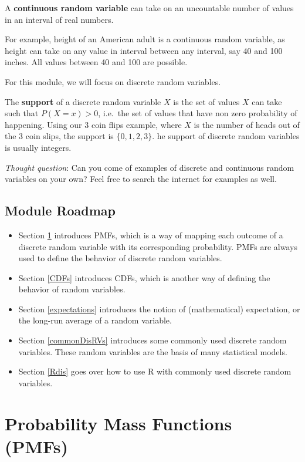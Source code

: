 \documentclass[
]{book}
\providecommand{\tightlist}{%
  \setlength{\itemsep}{0pt}\setlength{\parskip}{0pt}}
\begin{document}
A \textbf{continuous random variable} can take on an uncountable number of values in an interval of real numbers.

For example, height of an American adult is a continuous random variable, as height can take on any value in interval between any interval, say 40 and 100 inches. All values between 40 and 100 are possible.

For this module, we will focus on discrete random variables.

The \textbf{support} of a discrete random variable \(X\) is the set of values \(X\) can take such that \(P(X = x) > 0\), i.e.~the set of values that have non zero probability of happening. Using our 3 coin flips example, where \(X\) is the number of heads out of the 3 coin slips, the support is \(\{0,1,2,3 \}\). he support of discrete random variables is usually integers.

\emph{Thought question}: Can you come of examples of discrete and continuous random variables on your own? Feel free to search the internet for examples as well.

\hypertarget{module-roadmap-1}{%
\subsection{Module Roadmap}\label{module-roadmap-1}}

\begin{itemize}
\tightlist
\item
  Section \ref{PMFs} introduces PMFs, which is a way of mapping each outcome of a discrete random variable with its corresponding probability. PMFs are always used to define the behavior of discrete random variables.
\item
  Section \ref{CDFs} introduces CDFs, which is another way of defining the behavior of random variables.
\item
  Section \ref{expectations} introduces the notion of (mathematical) expectation, or the long-run average of a random variable.
\item
  Section \ref{commonDisRVs} introduces some commonly used discrete random variables. These random variables are the basis of many statistical models.
\item
  Section \ref{Rdis} goes over how to use R with commonly used discrete random variables.
\end{itemize}

\hypertarget{PMFs}{%
\section{Probability Mass Functions (PMFs)}\label{PMFs}}
\end{document}
